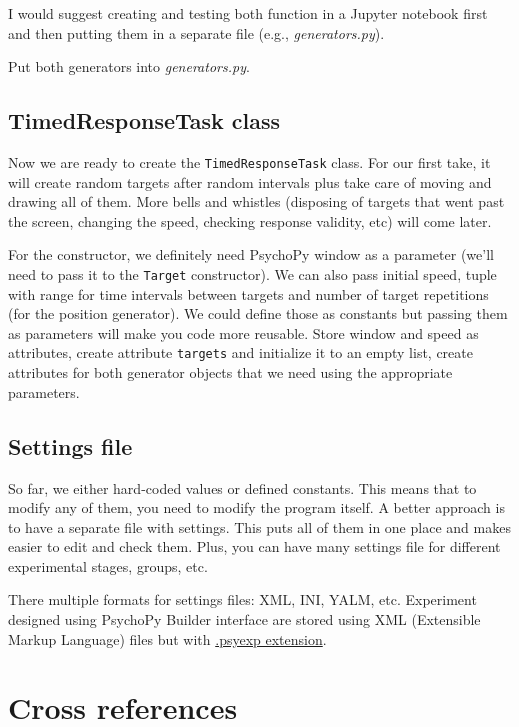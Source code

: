 \documentclass[
]{book}
\begin{document}
I would suggest creating and testing both function in a Jupyter notebook first and then putting them in a separate file (e.g., \emph{generators.py}).

Put both generators into \emph{generators.py}.

\hypertarget{timedresponsetask-class}{%
\section{TimedResponseTask class}\label{timedresponsetask-class}}

Now we are ready to create the \texttt{TimedResponseTask} class. For our first take, it will create random targets after random intervals plus take care of moving and drawing all of them. More bells and whistles (disposing of targets that went past the screen, changing the speed, checking response validity, etc) will come later.

For the constructor, we definitely need PsychoPy window as a parameter (we'll need to pass it to the \texttt{Target} constructor). We can also pass initial speed, tuple with range for time intervals between targets and number of target repetitions (for the position generator). We could define those as constants but passing them as parameters will make you code more reusable. Store window and speed as attributes, create attribute \texttt{targets} and initialize it to an empty list, create attributes for both generator objects that we need using the appropriate parameters.

\hypertarget{settings-file}{%
\section{Settings file}\label{settings-file}}

So far, we either hard-coded values or defined constants. This means that to modify any of them, you need to modify the program itself. A better approach is to have a separate file with settings. This puts all of them in one place and makes easier to edit and check them. Plus, you can have many settings file for different experimental stages, groups, etc.

There multiple formats for settings files: XML, INI, YALM, etc. Experiment designed using PsychoPy Builder interface are stored using XML (Extensible Markup Language) files but with \href{https://www.psychopy.org/psyexp.html}{.psyexp extension}.

\hypertarget{cross-references}{%
\chapter*{Cross references}\label{cross-references}}
\end{document}

